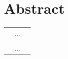 \chapter{Abstract}\label{chap:abstract}

\vfill

\begin{tabularx}{1\textwidth}{ p{1 cm} X p{1 cm} }

    {} & {
        ...
    } & {}\\

    \vspace{2\baselineskip}\\

    {} & {
        ...
    } & {}\\

\end{tabularx}

\vfill
